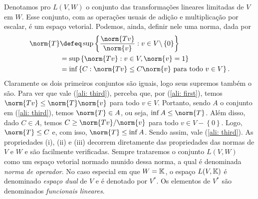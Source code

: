 Denotamos pro \( L(V, W) \) o conjunto das transformações lineares limitadas de \( V \) em \( W \).
Esse conjunto, com as operações usuais de adição e multiplicação por escalar, é um espaço vetorial.
Podemos, ainda, definir nele uma norma, dada por
\begin{align}
    \norm{ T } &\defeq \sup \left\{ \frac{ \norm{ Tv } }{ \norm{ v } } : v \in V \backslash \left\{ 0 \right\} \right\} \label{ali: first} \\
    &= \sup \left\{ \norm{ Tv } : v \in V, \norm{ v } = 1 \right\} \label{ali: sec} \\
    &= \inf \left\{ C : \norm{ Tv } \leq C \norm{ v } \text{ para todo } v \in V \right\}
    \label{ali: third}
.\end{align}
Claramente os dois primeiros conjuntos são iguais, logo seus supremos também o são.
Para ver que vale (\ref{ali: third}), perceba que, por (\ref{ali: first}), temos \( \norm{ Tv } \leq \norm{ T } \norm{ v } \) para todo \( v \in V \).
Portanto, sendo \( A \) o conjunto em (\ref{ali: third}), temos \( \norm{ T } \in A \), ou seja, \( \inf A \leq \norm{ T } \).
Além disso, dado \( C \in A \), temos \( C \geq \norm{ Tv } / \norm{ v } \) para todo \( v \in V - \left\{ 0 \right\} \).
Logo, \( \norm{ T } \leq C \) e, com isso, \( \norm{ T } \leq \inf A \).
Sendo assim, vale (\ref{ali: third}).
As propriedades (i), (ii) e (iii) decorrem diretamente das propriedades das normas de \( V \) e \( W \) e são facilmente verificadas.
Sempre trataremos o conjunto \( L(V, W) \) como um espaço vetorial normado munido dessa norma, a qual é denominada \emph{norma de operador}. 
No caso especial em que \( W = \mathbb{K} \),
o espaço \( L(V, \mathbb{K}) \) é denominado \emph{espaço dual} de \( V \) e é denotado por \( V^{ * } \).
Os elementos de \( V^{ * } \) são denominados \emph{funcionais lineares}.


